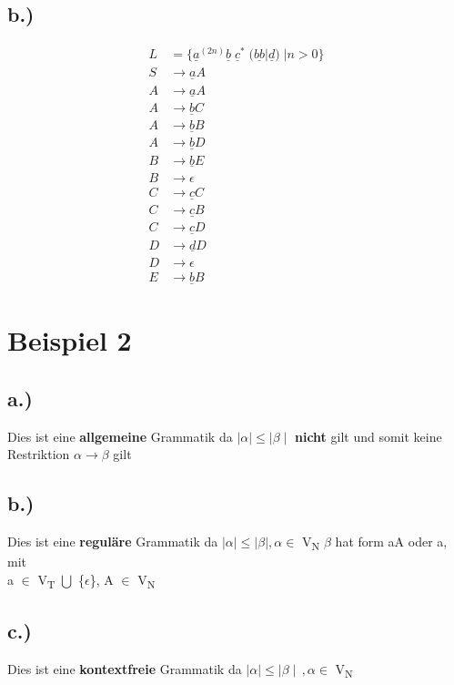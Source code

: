 \documentclass[12pt,runningheads,a4paper]{llncs}
\begin{document}
\subsection*{b.)}
\begin{align*}
L &= \{\underline{a}^{(2n)} \underline{b} \; \underline{c}^* \; (\underline{bb} | \underline{d}) \; | n>0 \}\\
S &\rightarrow \underline{a}A  \\
A &\rightarrow \underline{a}A  \\
A &\rightarrow \underline{b}C  \\
A &\rightarrow \underline{b}B  \\
A &\rightarrow \underline{b}D  \\
B &\rightarrow \underline{b}E  \\
B &\rightarrow \epsilon  \\
C &\rightarrow \underline{c}C  \\
C &\rightarrow \underline{c}B  \\
C &\rightarrow \underline{c}D  \\
D &\rightarrow \underline{d}D  \\
D &\rightarrow \epsilon  \\
E &\rightarrow \underline{b}B
\end{align*}

\section*{Beispiel 2}
\subsection*{a.)}
Dies ist eine \textbf{allgemeine} Grammatik da $ \mid\alpha\mid \leq \mid\beta\mid$ \textbf{nicht} gilt und somit keine Restriktion $\alpha \rightarrow \beta$  gilt 
\subsection*{b.)}
Dies ist eine \textbf{reguläre} Grammatik da $ \mid\alpha\mid \leq \mid\beta\mid , \alpha \in$ V\textsubscript{N} 
$\beta$ hat form aA oder a, mit \\a $\in$ V\textsubscript{T} $\bigcup$ \{$\epsilon$\}, A $\in$ V\textsubscript{N}
\subsection*{c.)}
Dies ist eine \textbf{kontextfreie} Grammatik da  $\mid\alpha\mid \leq \mid\beta\mid\, , \alpha \in$ V\textsubscript{N}
\end{document}
